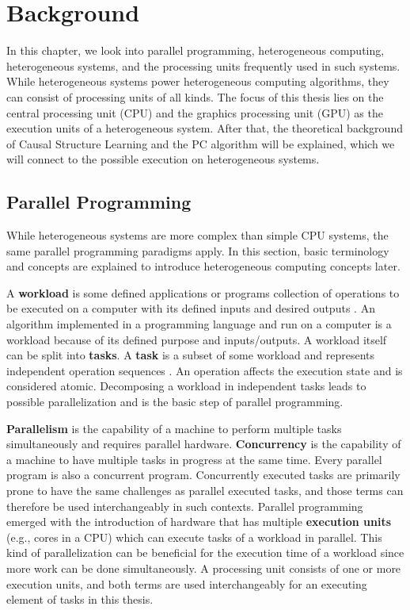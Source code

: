 \chapter{Background}
In this chapter, we look into parallel programming, heterogeneous computing, heterogeneous systems, and the processing units frequently used in such systems. While heterogeneous systems power heterogeneous computing algorithms, they can consist of processing units of all kinds. The focus of this thesis lies on the central processing unit (CPU) and the graphics processing unit (GPU) as the execution units of a heterogeneous system.
After that, the theoretical background of Causal Structure Learning and the PC algorithm will be explained, which we will connect to the possible execution on heterogeneous systems.

\section{Parallel Programming}
While heterogeneous systems are more complex than simple CPU systems, the same parallel programming paradigms apply. In this section, basic terminology and concepts are explained to introduce heterogeneous computing concepts later.

A \textbf{workload} is some defined applications or programs collection of operations to be executed on a computer with its defined inputs and desired outputs \cite{pfister1998search}. An algorithm implemented in a programming language and run on a computer is a workload because of its defined purpose and inputs/outputs. A workload itself can be split into \textbf{tasks}. A \textbf{task} is a subset of some workload and represents independent operation sequences \cite{breshearsArtConcurrencyThread2009}. An operation affects the execution state and is considered atomic. Decomposing a workload in independent tasks leads to possible parallelization and is the basic step of parallel programming.

\textbf{Parallelism} is the capability of a machine to perform multiple tasks simultaneously and requires parallel hardware. \textbf{Concurrency} is the capability of a machine to have multiple tasks in progress at the same time. Every parallel program is also a concurrent program. Concurrently executed tasks are primarily prone to have the same challenges as parallel executed tasks, and those terms can therefore be used interchangeably in such contexts. Parallel programming emerged with the introduction of hardware that has multiple \textbf{execution units} (e.g., cores in a CPU) \cite{mattsonPatternsParallelProgramming2004} which can execute tasks of a workload in parallel. This kind of parallelization can be beneficial for the execution time of a workload since more work can be done simultaneously. A processing unit consists of one or more execution units, and both terms are used interchangeably for an executing element of tasks in this thesis.

